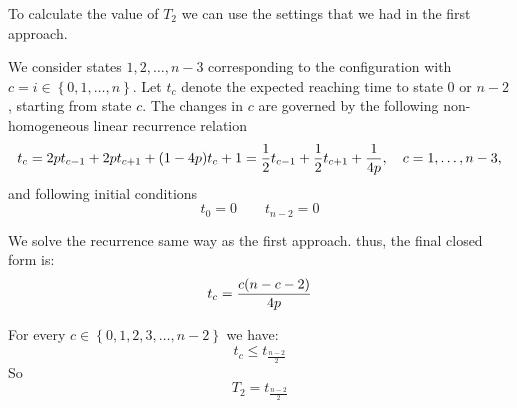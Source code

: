 \documentclass[]{book}
\theoremstyle{definition}
\begin{document}
To calculate the value of $T_2$ we can use the settings that we had in the first approach.

\begin{center}
\end{center}

We consider states $1,2,\ldots,n-3$ corresponding to the configuration with $c = i \in \left\{0,1,\ldots,n\right\}$. 
Let $t_c$ denote the expected reaching time to state $0$ or $n-2$, starting from state $c$.
The changes in $c$ are governed by the following non-homogeneous linear recurrence relation
\begin{equation}    \label{mainEquation}
    t_c 
    = 2p t_{c-1}  + 2p t_{c+1} + (1 - 4p)t_{c} + 1\\
    = \frac{1}{2}t_{c-1} + \frac{1}{2}t_{c+1} + \frac{1}{4p}, \quad c = 1,\ldots,n-3,
\end{equation}
and following initial conditions
\begin{equation}\label{recursiveEquation_t_0}
    t_0 = 0 \qquad t_{n-2} = 0
\end{equation}

We solve the recurrence same way as the first approach. thus, the final closed form is:
\begin{equation} \label{closed form}
    t_c = \frac{c(n-c-2)}{4p}\\
\end{equation}

For every $c \in \left\{0, 1, 2, 3, \hdots, n-2\right\}$ we have:
\begin{equation*} \label{}
    t_c \le t_{\frac{n-2}{2}}
\end{equation*}
So
\begin{equation} \label{}
    T_2 = t_{\frac{n-2}{2}}
\end{equation}
\end{document}
